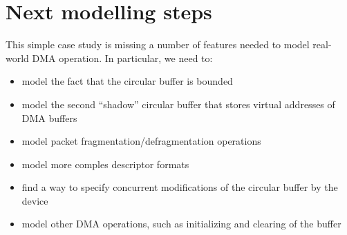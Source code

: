 \documentclass{article}
\begin{document}
\section{Next modelling steps}

This simple case study is missing a number of features needed to 
model real-world DMA operation.  In particular, we need to:

\begin{itemize}
    \item model the fact that the circular buffer is bounded
    \item model the second ``shadow'' circular buffer that stores 
        virtual addresses of DMA buffers
    \item model packet fragmentation/defragmentation operations
    \item model more comples descriptor formats
    \item find a way to specify concurrent modifications of the 
        circular buffer by the device
    \item model other DMA operations, such as initializing and 
        clearing of the buffer

\end{itemize}
\end{document}

